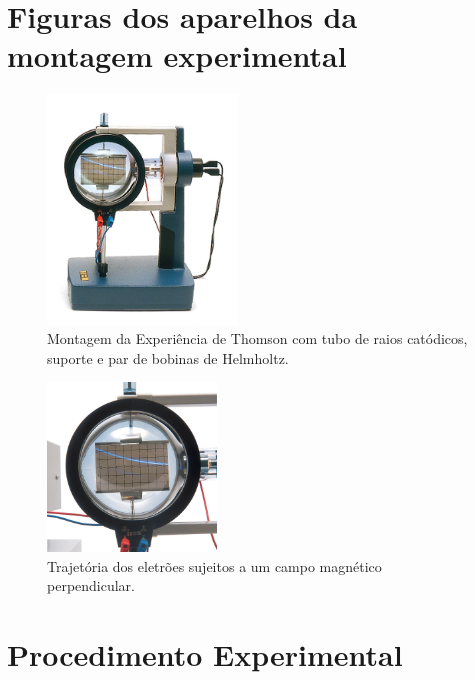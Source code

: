 \documentclass[12pt,a4paper,oneside]{paper}
\begin{document}
\newpage
\section{\sf Figuras dos aparelhos da montagem experimental}
\begin{figure}[H]
	\centering 
	\includegraphics[width=0.45\textwidth]{./thomson_images/fig3-ThomsomEquip}
	\caption{Montagem da Experiência de Thomson com tubo de raios catódicos, suporte e par de bobinas de Helmholtz.
    \label{fig:Thomson_Equip}} 
\end{figure}

\begin{figure}[H]
	\centering 
	\includegraphics[width=0.4\textwidth]{./thomson_images/fig4-Thomson_Electron-Deflection-Tube-D}
	\caption{Trajetória dos eletrões sujeitos a um campo magnético perpendicular. \label{fig:Thomson_trajec}} 
\end{figure}



\newpage

\section{\sf Procedimento Experimental}
\end{document}
